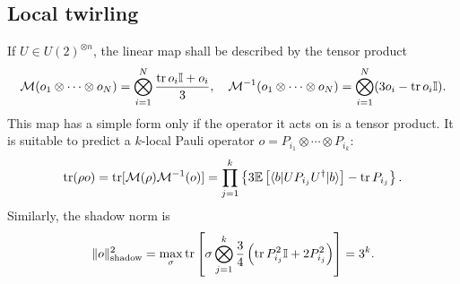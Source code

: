 \documentclass{SciPost}
\begin{document}
\subsection{Local twirling}

If $U \in U(2)^{\otimes n}$, the linear map shall be described by the tensor product
\begin{equation}
	\mathcal{M}(o_1\otimes\cdots\otimes o_N) = \bigotimes_{i=1}^N \frac{\operatorname{tr} o_i\mathbb{I} + o_i}{3},\quad
	\mathcal{M}^{-1}(o_1\otimes\cdots\otimes o_N) = \bigotimes_{i=1}^N (3 o_i-\operatorname{tr} o_i\mathbb{I}).
\end{equation}
This map has a simple form only if the operator it acts on is a tensor product. It is suitable to predict a $k$-local Pauli operator $o = P_{i_1}\otimes\cdots\otimes P_{i_k}$:
\begin{equation}
	\operatorname{tr}(\rho o) = \operatorname{tr}[\mathcal{M}(\rho)\mathcal{M}^{-1}(o)]
	= \prod_{j=1}^k \left\{3\mathbb{E}\left[\langle b| U P_{i_j} U^\dagger |b\rangle\right] - \operatorname{tr} P_{i_j} \right\}.
\end{equation}
Similarly, the shadow norm is
\begin{equation}
	\Vert o \Vert_\text{shadow}^2 = \max_{\sigma} \operatorname{tr}\left[\sigma \bigotimes_{j=1}^k \frac{3}{4}\left(\operatorname{tr} P_{i_j}^2 \mathbb I+2 P_{i_j}^2 \right) \right]
	= 3^k.
\end{equation}
\end{document}
